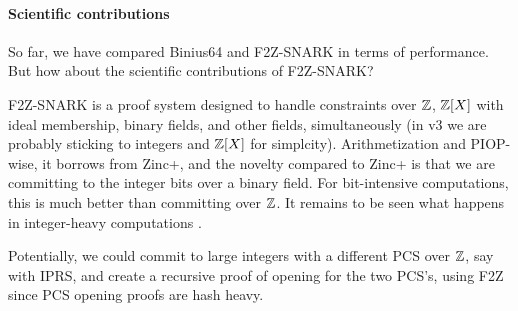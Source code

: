 \documentclass[11pt,letterpaper,usenames,dvipsnames]{article}
\begin{document}
\paragraph{Scientific contributions}
So far, we have compared Binius64 and F2Z-SNARK in terms of performance. But how about the scientific contributions of F2Z-SNARK?

F2Z-SNARK is a proof system designed to handle constraints over $\mathbb{Z}$, $\mathbb{Z}[X]$ with ideal membership, binary fields, and other fields, simultaneously (in v3 we are probably sticking to integers and $\mathbb{Z}[X]$ for simplcity). Arithmetization and PIOP-wise, it borrows from Zinc+, and the novelty compared to Zinc+ is that we are committing to the integer bits over a binary field. For bit-intensive computations, this is much better than committing over $\mathbb{Z}$. It remains to be seen what happens in integer-heavy computations . 

Potentially, we could commit to large integers with a different PCS over $\mathbb{Z}$, say with IPRS, and create a recursive proof of opening for the two PCS's, using F2Z since PCS opening proofs are hash heavy. 
\end{document}
